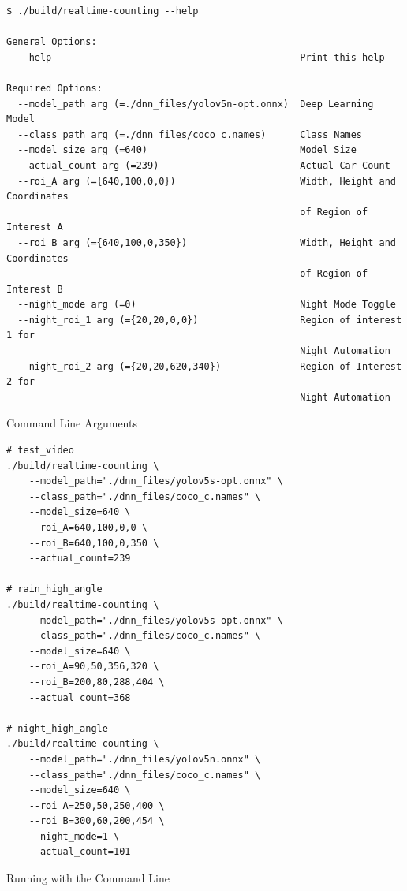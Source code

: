 \documentclass[12pt,a4paper,fleqn]{report}
\begin{document}
\begin{listing}[htbp]
\begin{verbatim}
$ ./build/realtime-counting --help

General Options:
  --help                                            Print this help

Required Options:
  --model_path arg (=./dnn_files/yolov5n-opt.onnx)  Deep Learning Model
  --class_path arg (=./dnn_files/coco_c.names)      Class Names
  --model_size arg (=640)                           Model Size
  --actual_count arg (=239)                         Actual Car Count
  --roi_A arg (={640,100,0,0})                      Width, Height and Coordinates
                                                    of Region of Interest A
  --roi_B arg (={640,100,0,350})                    Width, Height and Coordinates
                                                    of Region of Interest B
  --night_mode arg (=0)                             Night Mode Toggle
  --night_roi_1 arg (={20,20,0,0})                  Region of interest 1 for 
                                                    Night Automation
  --night_roi_2 arg (={20,20,620,340})              Region of Interest 2 for 
                                                    Night Automation
\end{verbatim}
\caption{Command Line Arguments}
\label{lst:cla}
\end{listing}

\begin{listing}[htbp]
\begin{verbatim}
# test_video
./build/realtime-counting \
    --model_path="./dnn_files/yolov5s-opt.onnx" \
    --class_path="./dnn_files/coco_c.names" \
    --model_size=640 \
    --roi_A=640,100,0,0 \
    --roi_B=640,100,0,350 \
    --actual_count=239

# rain_high_angle
./build/realtime-counting \
    --model_path="./dnn_files/yolov5s-opt.onnx" \
    --class_path="./dnn_files/coco_c.names" \
    --model_size=640 \
    --roi_A=90,50,356,320 \
    --roi_B=200,80,288,404 \
    --actual_count=368

# night_high_angle
./build/realtime-counting \
    --model_path="./dnn_files/yolov5n.onnx" \
    --class_path="./dnn_files/coco_c.names" \
    --model_size=640 \
    --roi_A=250,50,250,400 \
    --roi_B=300,60,200,454 \
    --night_mode=1 \
    --actual_count=101

\end{verbatim}
\caption{Running with the Command Line}
\label{lst:clrun}
\end{listing}
\end{document}
